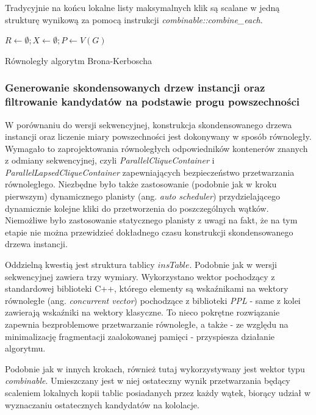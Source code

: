 \documentclass[12pt]{article}
\begin{document}
Tradycyjnie na końcu lokalne listy maksymalnych klik są scalane w jedną strukturę wynikową za pomocą instrukcji \textit{combinable::combine\_each}.
\begin{algorithm}

$R \leftarrow \emptyset; X \leftarrow \emptyset; P \leftarrow V(G)$\;
\caption{Równoległy algorytm Brona-Kerboscha}
\label{alg:bk3}
\end{algorithm}


\subsubsection{Generowanie skondensowanych drzew instancji oraz filtrowanie kandydatów na podstawie progu powszechności}

W porównaniu do wersji sekwencyjnej, konstrukcja skondensowanego drzewa instancji oraz liczenie miary powszechności jest dokonywany w sposób równoległy. Wymagało to zaprojektowania równoległych odpowiedników kontenerów znanych z odmiany sekwencyjnej, czyli \textit{ParallelCliqueContainer} i \textit{ParallelLapsedCliqueContainer} zapewniających bezpieczeństwo przetwarzania równoległego. Niezbędne było także zastosowanie (podobnie jak w kroku pierwszym) dynamicznego planisty (ang. \textit{auto scheduler}) przydzielającego dynamicznie kolejne kliki do przetworzenia do poszczególnych wątków. Niemożliwe było zastosowanie statycznego planisty z uwagi na fakt, że na tym etapie nie można przewidzieć dokładnego czasu konstrukcji skondensowanego drzewa instancji.

Oddzielną kwestią jest struktura tablicy $ insTable $. Podobnie jak w wersji sekwencyjnej zawiera trzy wymiary. Wykorzystano wektor pochodzący z standardowej biblioteki C++, którego elementy są wskaźnikami na wektory równoległe (ang. \textit{concurrent vector}) pochodzące z biblioteki \textit{PPL} - same z kolei zawierają wskaźniki na wektory klasyczne. To nieco pokrętne rozwiązanie zapewnia bezproblemowe przetwarzanie równoległe, a także - ze względu na minimalizację fragmentacji zaalokowanej pamięci - przyspiesza działanie algorytmu.

Podobnie jak w innych krokach, również tutaj wykorzystywany jest wektor typu \textit{combinable}. Umieszczany jest w niej ostateczny wynik przetwarzania będący scaleniem lokalnych kopii tablic posiadanych przez każdy wątek, biorący udział w wyznaczaniu ostatecznych kandydatów na kololacje.
\end{document}
